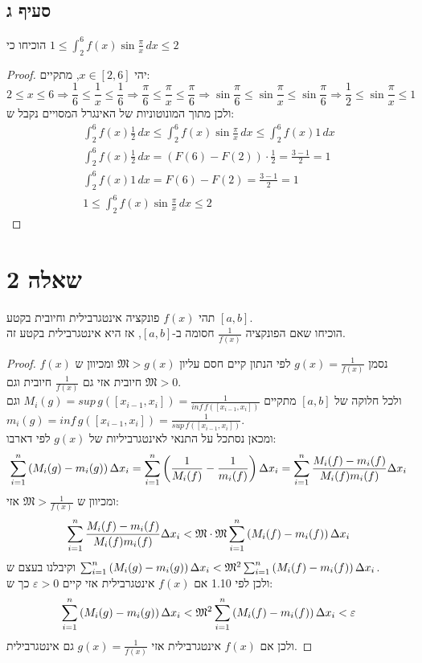 \documentclass{article}
\begin{document}
	\pagebreak
	\subsection*{סעיף ג}
	הוכיחו כי $1 \leq \int_2^6 f(x) \sin \frac{\pi}{x} \, dx \leq 2$
	\begin{proof}
		יהי $x \in [2,6]$, מתקיים:
		\[
		2 \leq x \leq 6
		\Rightarrow
		\frac{1}{6} \leq \frac{1}{x} \leq \frac{1}{6}
		\Rightarrow
		\frac{\pi}{6} \leq \frac{\pi}{x} \leq \frac{\pi}{6}
		\Rightarrow
		\sin \frac{\pi}{6} \leq \sin \frac{\pi}{x} \leq \sin \frac{\pi}{6}
		\Rightarrow
		\boxed{\frac{1}{2} \leq \sin \frac{\pi}{x} \leq 1}
		\]
		ולכן מתוך המונוטוניות של האינגרל המסויים נקבל ש:
		\setcounter{equation}{0} \begin{align}
			\int_2^6 f(x) \frac{1}{2} \, dx \leq
			\int_2^6 f(x) \sin \frac{\pi}{x} \, dx \leq
			\int_2^6 f(x) 1 \, dx \\
			\int_2^6 f(x) \frac{1}{2} \, dx = (F(6) - F(2)) \cdot \frac{1}{2} = \frac{3 - 1}{2} = 1 \\
			\int_2^6 f(x) 1 \, dx = F(6) - F(2) = \frac{3 - 1}{2} = 1 \\
			1 \leq \int_2^6 f(x) \sin \frac{\pi}{x} \, dx \leq 2
		\end{align}
	\end{proof}


	\section*{שאלה 2}
	תהי $f(x)$ פונקציה אינטגרבילית וחיובית בקטע $[a,b]$. \\
	הוכיחו שאם הפונקציה $\frac{1}{f(x)}$ חסומה ב-$[a,b]$, אז היא אינטגרבילית בקטע זה.
	\begin{proof}
		נסמן $g(x) = \frac{1}{f(x)}$
		לפי הנתון קיים חסם עליון $\mathfrak{M} > g(x)$ ומכיוון ש $f(x)$ חיובית אזי גם $\frac{1}{f(x)}$ חיובית וגם $\mathfrak{M} > 0$. \\
		ולכל חלוקה של $[a,b]$ מתקיים $M_i(g) = sup \, g([x_{i-1}, x_i]) = \frac{1}{inf \, f([x_{i-1}, x_i])}$ וגם \\
		$m_i(g) = inf \, g([x_{i-1}, x_i]) = \frac{1}{sup \, f([x_{i-1}, x_i])}$. \\
		ומכאן נסתכל על התנאי לאינטגרביליות של $g(x)$ לפי דארבו:
		\[
		\sum_{i=1}^n \left( M_i(g) - m_i(g) \right) \Delta x_i =
		\sum_{i=1}^n \left( \frac{1}{M_i(f)} - \frac{1}{m_i(f)} \right) \Delta x_i =
		\sum_{i=1}^n \frac{M_i(f) - m_i(f)}{M_i(f)m_i(f)} \Delta x_i
		\]
		ומכיוון ש $\mathfrak{M} > \frac{1}{f(x)}$ אזי:
		\[
			\sum_{i=1}^n \frac{M_i(f) - m_i(f)}{M_i(f)m_i(f)} \Delta x_i  <
			\mathfrak{M} \cdot \mathfrak{M} \sum_{i=1}^n \left( M_i(f) - m_i(f) \right) \Delta x_i
		\]
		וקיבלנו בעצם ש $\sum_{i=1}^n \left( M_i(g) - m_i(g) \right) \Delta x_i < \mathfrak{M}^2 \sum_{i=1}^n \left( M_i(f) - m_i(f) \right) \Delta x_i$. \\
		ולכן לפי 1.10 אם $f(x)$ אינטגרבילית אזי קיים $\varepsilon > 0$ כך ש:
		\[\sum_{i=1}^n \left( M_i(g) - m_i(g) \right) \Delta x_i < \mathfrak{M}^2 \sum_{i=1}^n \left( M_i(f) - m_i(f) \right) \Delta x_i < \varepsilon\]
		ולכן אם $f(x)$ אינטגרבילית אזי $g(x) = \frac{1}{f(x)}$ גם אינטגרבילית.

	\end{proof}
\end{document}
